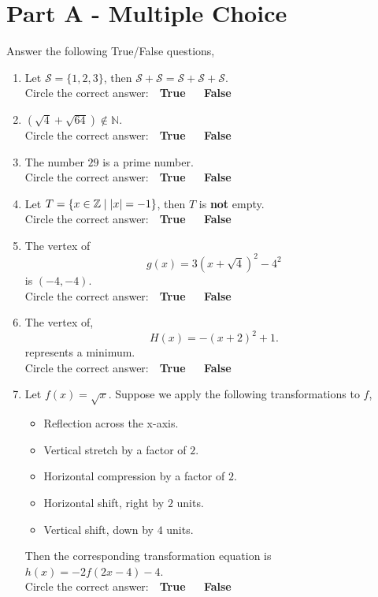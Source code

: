 \documentclass[12pt]{article} %
\begin{document}
\section*{Part A - Multiple Choice}
\begin{qstn} %
  Answer the following True/False questions,
  \begin{enumerate}
    \item Let $\mathcal{S} = \{1,2,3\}$, then $\mathcal{S} + \mathcal{S} = \mathcal{S} + \mathcal{S} +
      \mathcal{S}$.\\ 
      Circle the correct answer: \,\, \textbf{True} \,\,\,\,\,\, \textbf{False}

    \item $\left(\sqrt{4} + \sqrt{64} \right) \not \in \mathbb N$.\\
      Circle the correct answer: \,\, \textbf{True} \,\,\,\,\,\, \textbf{False}

    \item The number $29$ is a prime number.\\
      Circle the correct answer: \,\, \textbf{True} \,\,\,\,\,\, \textbf{False}

    \item Let $T = \{x \in \Z \mid \left|x\right| = -1\} $, then $T$ is \textbf{not} empty.\\
      Circle the correct answer: \,\, \textbf{True} \,\,\,\,\,\, \textbf{False}

    \item The vertex of 
      \[
        g(x) = 3\left( x + \sqrt{4}  \right)^2 - 4^2  
      \] is $(-4,-4)$.\\ 
      Circle the correct answer: \,\, \textbf{True} \,\,\,\,\,\, \textbf{False}

    \item The vertex of,
      \[
            H(x) = -\left( x + 2 \right)^2 + 1
      .\] represents a minimum.\\
      Circle the correct answer: \,\, \textbf{True} \,\,\,\,\,\, \textbf{False}

    \item Let $f(x) = \sqrt{x}$. Suppose we apply the following transformations to $f$,
      \begin{itemize}
        \item Reflection across the x-axis.
        \item Vertical stretch by a factor of $2$. 
        \item Horizontal compression by a factor of $2$.
        \item Horizontal shift, right by $2$ units.
        \item Vertical shift, down by $4$ units.
      \end{itemize}
      Then the corresponding transformation equation is $h(x) = -2f(2x - 4) - 4$.\\
      Circle the correct answer: \,\, \textbf{True} \,\,\,\,\,\, \textbf{False}


\end{enumerate}
\end{qstn}
\end{document}
